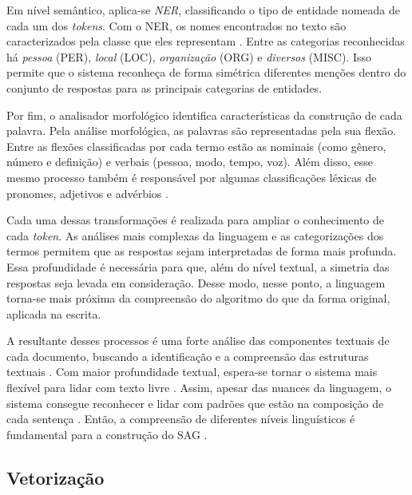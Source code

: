 Em nível semântico, aplica-se \textit{NER}, classificando o tipo de entidade nomeada de cada um dos \textit{tokens}. Com o NER, os nomes encontrados no texto são caracterizados pela classe que eles representam \cite{pirovani2019}. Entre as categorias reconhecidas há \textit{pessoa} (PER), \textit{local} (LOC), \textit{organização} (ORG) e \textit{diversos} (MISC). Isso permite que o sistema reconheça de forma simétrica diferentes menções dentro do conjunto de respostas para as principais categorias de entidades.

Por fim, o analisador morfológico identifica características da construção de cada palavra. Pela análise morfológica, as palavras são representadas pela sua flexão. Entre as flexões classificadas por cada termo estão as nominais (como gênero, número e definição) e verbais (pessoa, modo, tempo, voz). Além disso, esse mesmo processo também é responsável por algumas classificações léxicas de pronomes, adjetivos e advérbios \cite{marneffe2021}.

Cada uma dessas transformações é realizada para ampliar o conhecimento de cada \textit{token}. As análises mais complexas da linguagem e as categorizações dos termos permitem que as respostas sejam interpretadas de forma mais profunda. Essa profundidade é necessária para que, além do nível textual, a simetria das respostas seja levada em consideração. Desse modo, nesse ponto, a linguagem torna-se mais próxima da compreensão do algoritmo do que da forma original, aplicada na escrita.

A resultante desses processos é uma forte análise das componentes textuais de cada documento, buscando a identificação e a compreensão das estruturas textuais \cite{spalenza2020}. Com maior profundidade textual, espera-se tornar o sistema mais flexível para lidar com texto livre \cite{ding2020}. Assim, apesar das nuances da linguagem, o sistema consegue reconhecer e lidar com padrões que estão na composição de cada sentença \cite{filighera2020}. Então, a compreensão de diferentes níveis linguísticos é fundamental para a construção do SAG \cite{sahu2020}.


\subsection{Vetorização}
\label{subsec-vetorizacao}

